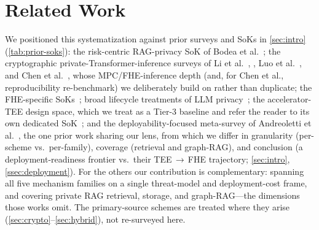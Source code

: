 \section{Related Work}
\label{sec:related}

We positioned this systematization against prior surveys and SoKs in \cref{sec:intro}
(\cref{tab:prior-soks}): the risk-centric RAG-privacy SoK of Bodea et
al.~\citep{bodea_sok}; the cryptographic private-Transformer-inference surveys of Li et
al.~\citep{li_pti_survey}, \citet{pti_survey_2024}, Luo et
al.~\citep{luo_cplm_survey}, and Chen et al.~\citep{chen_sok_pti}, whose MPC/FHE-inference
depth (and, for Chen et al., reproducibility re-benchmark) we deliberately build on rather
than duplicate; the FHE-specific SoKs~\citep{xue_fhe_sok,albadawi_ckks_sok}; broad
lifecycle treatments of LLM privacy~\citep{ma_semantic_sok}; the accelerator-TEE
design space, which we treat as a Tier-3 baseline and refer the reader to its own dedicated
SoK~\citep{accel_tee_sok}; and the deployability-focused meta-survey of Andreoletti et
al.~\citep{andreoletti_ppi_practice}, the one prior work sharing our lens, from which we
differ in granularity (per-scheme vs.\ per-family), coverage (retrieval and graph-RAG), and
conclusion (a deployment-readiness frontier vs.\ their TEE\,$\to$\,FHE trajectory; \cref{sec:intro},
\cref{ssec:deployment}). For the others our contribution is complementary: spanning all
five mechanism families on a single threat-model and deployment-cost frame, and covering
private RAG retrieval, storage, and graph-RAG---the dimensions those works omit. The
primary-source schemes are treated where they arise (\cref{sec:crypto}--\cref{sec:hybrid}),
not re-surveyed here.
